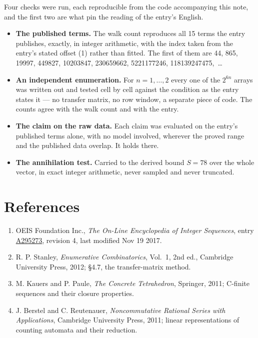 \documentclass[11pt]{article}
\theoremstyle{definition}
\begin{document}
Four checks were run, each reproducible from the code accompanying this note, and the first two are what pin the reading of the entry's English.

\begin{itemize}

\item {\bfseries The published terms.} The walk count reproduces all 15 terms the entry publishes, exactly, in integer arithmetic, with the index taken from the entry's stated offset (1) rather than fitted. The first of them are 44, 865, 19997, 449827, 10203847, 230659662, 5221177246, 118139247475,~\dots

\item {\bfseries An independent enumeration.} For $n = 1,\dots,2$ every one of the $2^{6n}$ arrays was written out and tested cell by cell against the condition as the entry states it --- no transfer matrix, no row window, a separate piece of code. The counts agree with the walk count and with the entry.

\item {\bfseries The claim on the raw data.} Each claim was evaluated on the entry's published terms alone, with no model involved, wherever the proved range and the published data overlap. It holds there.

\item {\bfseries The annihilation test.} Carried to the derived bound $S = 78$ over the whole vector, in exact integer arithmetic, never sampled and never truncated.

\end{itemize}

\section{References}

\begin{enumerate}

\item OEIS Foundation Inc., \emph{The On-Line Encyclopedia of Integer Sequences}, entry \href{https://oeis.org/A295273}{A295273}, revision 4, last modified Nov 19 2017.

\item R. P. Stanley, \emph{Enumerative Combinatorics}, Vol.~1, 2nd ed., Cambridge University Press, 2012; \S4.7, the transfer-matrix method.

\item M. Kauers and P. Paule, \emph{The Concrete Tetrahedron}, Springer, 2011; C-finite sequences and their closure properties.

\item J. Berstel and C. Reutenauer, \emph{Noncommutative Rational Series with Applications}, Cambridge University Press, 2011; linear representations of counting automata and their reduction.

\end{enumerate}
\end{document}
